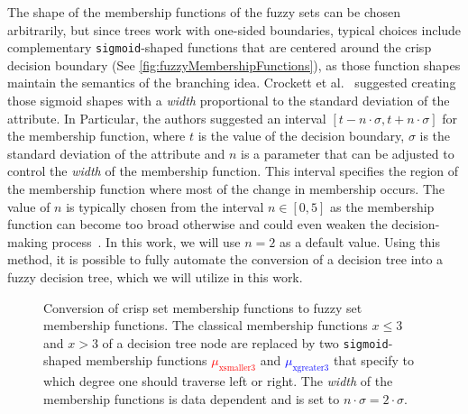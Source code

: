 The shape of the membership functions of the fuzzy sets can be chosen arbitrarily, but since trees work with one-sided boundaries, typical choices include complementary \texttt{sigmoid}-shaped functions that are centered around the crisp decision boundary (See \autoref{fig:fuzzyMembershipFunctions}), as those function shapes maintain the semantics of the branching idea. Crockett et al.~\cite{CROCKETT20062809} suggested creating those sigmoid shapes with a \emph{width} proportional to the standard deviation of the attribute. In Particular, the authors suggested an interval $[t-n\cdot \sigma, t+n\cdot \sigma]$ for the membership function, where  $t$ is the value of the decision boundary, $\sigma$ is the standard deviation of the attribute and $n$ is a parameter that can be adjusted to control the \emph{width} of the membership function. This interval specifies the region of the membership function where most of the change in membership occurs. The value of $n$ is typically chosen from the interval $n\in [0,5]$ as the membership function can become too broad otherwise and could even weaken the decision-making process~\cite{CROCKETT20062809}. In this work, we will use $n=2$ as a default value. Using this method, it is possible to fully automate the conversion of a decision tree into a fuzzy decision tree, which we will utilize in this work.


\begin{figure}[h]
    \centering
    \caption[Conversion of crisp tree node into fuzzy tree node]{Conversion of crisp set membership functions to fuzzy set membership functions. The classical membership functions $x \leq 3$ and $x>3$ of a decision tree node are replaced by two \texttt{sigmoid}-shaped membership functions \textcolor{red}{$\mu_{\text{xsmaller3}}$} and \textcolor{blue}{$\mu_{\text{xgreater3}}$} that specify to which degree one should traverse left or right. The \emph{width} of the membership functions is data dependent and is set to $n\cdot \sigma = 2 \cdot \sigma$. }
    \label{fig:fuzzyMembershipFunctions}
\end{figure}


